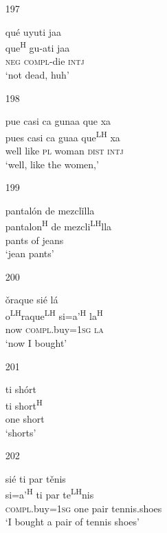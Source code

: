 \begin{itemize}
\item[197]
 
\glll   qu\'{e} uyuti jaa\\
 que\textsuperscript{H} gu-ati jaa\\
\textsc{neg} \textsc{compl}-die \textsc{intj}\\
\glt `not dead, huh'
 


\item[198]
 
\glll   pue casi ca gunaa que xa \\
 pues casi ca guaa que\textsuperscript{LH} xa\\
well like \textsc{pl}  woman \textsc{dist} \textsc{intj} \\
\glt `well, like the women,'
 


\item[199]
 
\glll   pantal\'{o}n de mezcl\v{i}lla\\
pantalon\textsuperscript{H} de mezcli\textsuperscript{LH}lla\\
 pants of jeans\\
\glt `jean pants'
 


\item[200]
 
\glll   \v{o}raque si\'{e} l\'{a}\\
o\textsuperscript{LH}raque\textsuperscript{LH} si=a'\textsuperscript{H} la\textsuperscript{H}\\
 now \textsc{compl}.buy=\textsc{1sg} \textsc{la}\\
\glt `now I bought'
 


\item[201]
 
\glll   ti sh\'{o}rt\\
ti short\textsuperscript{H}\\
one short \\
\glt `shorts'
 


\item[202]
 
\glll   si\'{e} ti par t\v{e}nis\\
si=a'\textsuperscript{H} ti par te\textsuperscript{LH}nis\\ 
 \textsc{compl}.buy=\textsc{1sg} one pair tennis.shoes\\
\glt `I bought a pair of tennis shoes'
 



\end{itemize}
